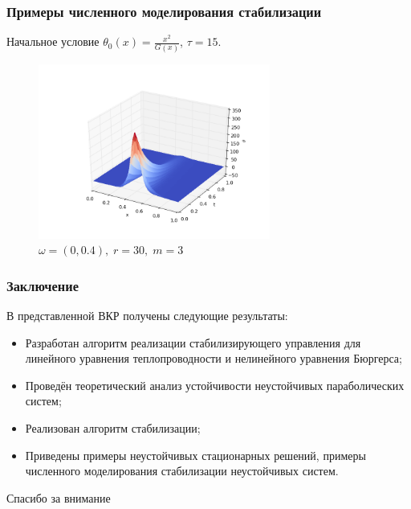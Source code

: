 \documentclass{beamer}
\begin{document}
\begin{frame}
    \frametitle{Примеры численного моделирования стабилизации}

    Начальное условие $\theta_0(x) = \frac{x^2}{G(x)}$, $\tau = 15$.

    \begin{figure}[H]
        \centering
        \includegraphics[width=3.0in]{re_x2_s15}
        \caption{$\omega = (0, 0.4), \; r = 30, \; m = 3$}
        \label{fig:test6}
    \end{figure}

\end{frame}


\begin{frame}
    \frametitle{Заключение}

    В представленной ВКР получены следующие результаты:

    \begin{itemize}

        \item{Разработан алгоритм реализации стабилизирующего
        управления для линейного уравнения теплопроводности и нелинейного уравнения
        Бюргерса;}

        \item{Проведён теоретический анализ устойчивости неустойчивых параболических
        систем;}

        \item{Реализован алгоритм стабилизации;}

        \item{Приведены примеры неустойчивых стационарных решений, примеры численного 
        моделирования стабилизации неустойчивых систем.}

    \end{itemize}

\end{frame}

\begin{frame}
    \begin{center}
        \Huge Спасибо за внимание
    \end{center}
\end{frame}
\end{document}
